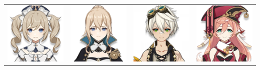 \documentclass[11pt]{article}
\begin{document}
\begin{center}
    \begin{tabular}{m{} m{} m{} m{}}
        \includegraphics[scale = 0.25]{Character_Barbara.png}  & \includegraphics[scale = 0.25]{Character_Jean.png} &  \includegraphics[scale = 0.25]{Character_Bennett.png} & \includegraphics[scale = 0.25]{Character_Yanfei.png}\\
    \end{tabular}
\end{center} 
\end{document}
